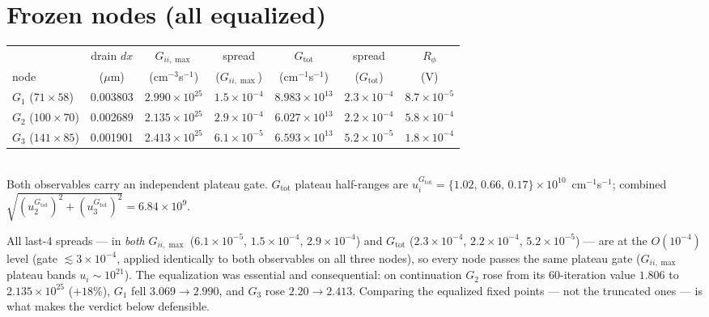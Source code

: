 \documentclass[11pt]{article}
\newcommand{\Gii}{G_{ii,\max}}
\newcommand{\Gtot}{G_{\mathrm{tot}}}
\begin{document}
\section{Frozen nodes (all equalized)}
\begin{center}
\begin{tabular}{lcccccc}
\toprule
 & drain $dx$ & $\Gii$ & spread & $\Gtot$ & spread & $R_\phi$\\
node & ($\mu$m) & (cm$^{-3}$s$^{-1}$) & ($\Gii$) & (cm$^{-1}$s$^{-1}$) & ($\Gtot$) & (V)\\
\midrule
$G_1$ ($71\times58$)  & 0.003803 & $2.990\times10^{25}$ & $1.5\times10^{-4}$ & $8.983\times10^{13}$ & $2.3\times10^{-4}$ & $8.7\times10^{-5}$\\
$G_2$ ($100\times70$) & 0.002689 & $2.135\times10^{25}$ & $2.9\times10^{-4}$ & $6.027\times10^{13}$ & $2.2\times10^{-4}$ & $5.8\times10^{-4}$\\
$G_3$ ($141\times85$) & 0.001901 & $2.413\times10^{25}$ & $6.1\times10^{-5}$ & $6.593\times10^{13}$ & $5.2\times10^{-5}$ & $1.8\times10^{-4}$\\
\bottomrule
\end{tabular}
\\[3pt]
{\footnotesize Both observables carry an independent plateau gate. $\Gtot$ plateau half-ranges are
$u_i^{\Gtot}=\{1.02,\,0.66,\,0.17\}\times10^{10}$~cm$^{-1}$s$^{-1}$; combined
$\sqrt{(u_2^{\Gtot})^2+(u_3^{\Gtot})^2}=6.84\times10^{9}$.}
\end{center}
All last-4 spreads --- in \emph{both} $\Gii$ ($6.1\times10^{-5}$, $1.5\times10^{-4}$,
$2.9\times10^{-4}$) and $\Gtot$ ($2.3\times10^{-4}$, $2.2\times10^{-4}$, $5.2\times10^{-5}$) --- are at
the $O(10^{-4})$ level (gate $\lesssim3\times10^{-4}$, applied identically to both observables on all
three nodes), so every node passes the same plateau gate ($\Gii$ plateau bands $u_i\sim10^{21}$).
The equalization was essential and consequential: on continuation $G_2$ rose from its 60-iteration
value $1.806$ to $2.135\times10^{25}$ ($+18\%$), $G_1$ fell $3.069\to2.990$, and $G_3$ rose
$2.20\to2.413$. Comparing the equalized fixed points --- not the truncated ones --- is what makes the
verdict below defensible.
\end{document}
